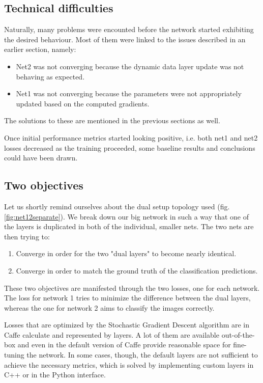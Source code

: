 \documentclass[a4paper, 12pt]{article}
\numberwithin{equation}{section}
\begin{document}
	\subsection{Technical difficulties}
	
	Naturally, many problems were encounted before the network started exhibiting the desired behaviour. Most of them were linked to the issues described in an earlier section, namely:
	
	\begin{itemize}
		\item Net2 was not converging because the dynamic data layer update was not behaving as expected.
		\item Net1 was not converging because the parameters were not appropriately updated based on the computed gradients.
	\end{itemize}
	
	The solutions to these are mentioned in the previous sections as well.
	
	Once initial performance metrics started looking positive, i.e. both net1 and net2 losses decreased as the training proceeded, some baseline results and conclusions could have been drawn.
	
	\subsection{Two objectives}
	
	Let us shortly remind ourselves about the dual setup topology used (fig. \ref{fig:net12separate}). We break down our big network in such a way that one of the layers is duplicated in both of the individual, smaller nets. The two nets are then trying to:
	\begin{enumerate}
		\item Converge in order for the two "dual layers" to become nearly identical.
		\item Converge in order to match the ground truth of the classification predictions.
	\end{enumerate}

	These two objectives are manifested through the two losses, one for each network. The loss for network 1 tries to minimize the difference between the dual layers, whereas the one for network 2 aims to classify the images correctly.
	
	Losses that are optimized by the Stochastic Gradient Descent algorithm are in Caffe calculate and represented by layers. A lot of them are available out-of-the-box and even in the default version of Caffe provide reasonable space for fine-tuning the network. In some cases, though, the default layers are not sufficient to achieve the necessary metrics, which is solved by implementing custom layers in C++ or in the Python interface.
		
\end{document}
